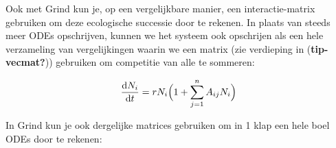 \documentclass[
  a4paper,
]{scrbook}
\theoremstyle{definition}
\theoremstyle{remark}
\begin{document}
Ook met Grind kun je, op een vergelijkbare manier, een interactie-matrix
gebruiken om deze ecologische successie door te rekenen. In plaats van
steeds meer ODEs opschrijven, kunnen we het systeem ook opschrijen als
een hele verzameling van vergelijkingen waarin we een matrix (zie
verdieping in (\textbf{tip-vecmat?})) gebruiken om competitie van alle
te sommeren:

\begin{align}
\mathchoice{\frac{\mathrm{d}N_i}
{\mathrm{d}t}}{\mathrm{d}N_i/\mathrm{d}t}
{\mathrm{d}N_i/\mathrm{d}t}
{\mathrm{d}N_i/\mathrm{d}t} = rN_i \Big( 1 + \sum_{j=1}^n{A_{ij}N_i} \Big)
\end{align}

In Grind kun je ook dergelijke matrices gebruiken om in 1 klap een hele
boel ODEs door te rekenen:
\end{document}
